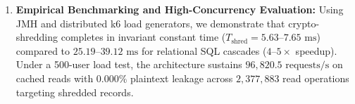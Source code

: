 \begin{enumerate}
    \item \textbf{Empirical Benchmarking and High-Concurrency Evaluation:} Using JMH and distributed k6 load generators, we demonstrate that crypto-shredding completes in invariant constant time ($T_{\text{shred}} = 5.63\text{--}7.65\text{~ms}$) compared to $25.19\text{--}39.12\text{~ms}$ for relational SQL cascades ($4\text{--}5\times$ speedup). Under a 500-user load test, the architecture sustains $96{,}820.5\text{~requests/s}$ on cached reads with $0.000\%$ plaintext leakage across $2{,}377{,}883$ read operations targeting shredded records.
\end{enumerate}